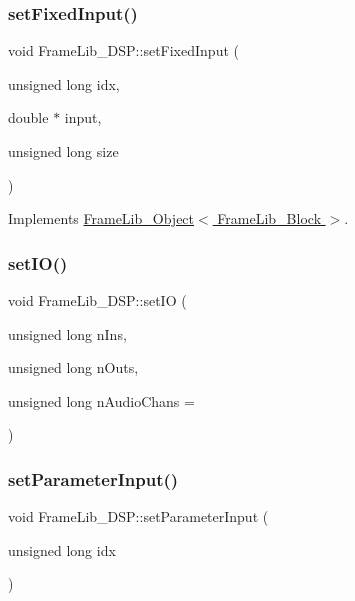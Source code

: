 \subsubsection{\texorpdfstring{set\+Fixed\+Input()}{setFixedInput()}}
{\footnotesize\ttfamily void Frame\+Lib\+\_\+\+D\+S\+P\+::set\+Fixed\+Input (\begin{DoxyParamCaption}\item[{unsigned long}]{idx,  }\item[{double $\ast$}]{input,  }\item[{unsigned long}]{size }\end{DoxyParamCaption})\hspace{0.3cm}{\ttfamily [virtual]}}



Implements \hyperlink{class_frame_lib___object_a0d3bed42a21ebf248366f4457722beff}{Frame\+Lib\+\_\+\+Object$<$ Frame\+Lib\+\_\+\+Block $>$}.

\mbox{\label{class_frame_lib___d_s_p_a3d184baeb7b55fa099cb9c4a7393c70c}} 
\subsubsection{\texorpdfstring{set\+I\+O()}{setIO()}}
{\footnotesize\ttfamily void Frame\+Lib\+\_\+\+D\+S\+P\+::set\+IO (\begin{DoxyParamCaption}\item[{unsigned long}]{n\+Ins,  }\item[{unsigned long}]{n\+Outs,  }\item[{unsigned long}]{n\+Audio\+Chans = {} }\end{DoxyParamCaption})\hspace{0.3cm}{\ttfamily [protected]}}

\mbox{\label{class_frame_lib___d_s_p_abcbe8babb74a7b85faf8846b4a0ff95f}} 
\subsubsection{\texorpdfstring{set\+Parameter\+Input()}{setParameterInput()}}
{\footnotesize\ttfamily void Frame\+Lib\+\_\+\+D\+S\+P\+::set\+Parameter\+Input (\begin{DoxyParamCaption}\item[{unsigned long}]{idx }\end{DoxyParamCaption})\hspace{0.3cm}{\ttfamily [protected]}}

